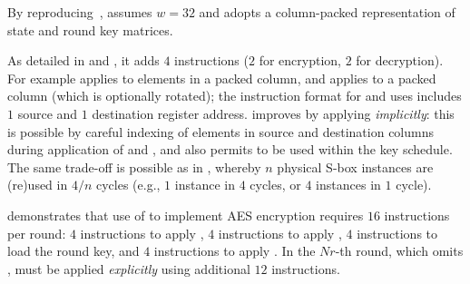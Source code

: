 
By reproducing~\cite[Section 4.3]{TilGro:06},
assumes 
$w = 32$
and adopts a 
column-packed 
representation of state and round key matrices.

As detailed in
and
,
it adds
$ 4$
instructions ($2$ for encryption, $2$ for decryption).
For example
 applies   to elements in   a packed column,
and
 applies  to               a packed column (which is optionally rotated);
the instruction format for
and
uses 
includes $1$ source and $1$ destination register address.
 improves  by applying  
{\em implicitly}:
this is possible by careful indexing of elements in source and destination
columns during application of  and ,
and also permits
to be used within the key schedule.
The same trade-off is possible as in , whereby
$n$ physical S-box instances are (re)used in $4/n$ cycles
(e.g., $1$ instance in $4$ cycles, or $4$ instances in $1$ cycle).

demonstrates that use of  to implement AES encryption requires
$16$
instructions per round:
$ 4$   instructions to apply ,
$ 4$   instructions to apply ,
$ 4$            instructions to load the round key,
and
$ 4$            instructions to apply .
In the $Nr$-th round, which omits ,
 must be applied
{\em explicitly}
using additional 
$12$
instructions.

